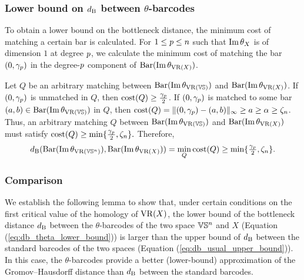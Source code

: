 \subsubsection{Lower bound on $d_{\mathrm{B}}$ between $\theta$-barcodes}
\label{subsub:db_theta_lower_bound}

To obtain a lower bound on the bottleneck distance, the minimum cost of matching a certain bar is calculated. 
For $1 \leq p \leq n$ such that $\operatorname{Im} \theta_X$ is of dimension $1$ at degree $p$, we calculate the minimum cost of matching the bar $(0,\gamma_p )$ in the degree-$p$ component of $\operatorname{Bar}(\operatorname{Im} \theta_{\operatorname{VR}(X)})$.


Let $Q$ be an arbitrary matching between $\operatorname{Bar}(\operatorname{Im} \theta_{\operatorname{VR}(\mathbb{V}\mathbb{S})})$ and $\operatorname{Bar}(\operatorname{Im} \theta_{\operatorname{VR}(X)})$.
If $(0,\gamma_p )$ is unmatched in $Q$, then $\mathrm{cost}(Q) \geq \tfrac{\gamma_p }{2}$. 
If $(0,\gamma_p )$ is matched to some bar $(a,b) \in \operatorname{Bar}(\operatorname{Im} \theta_{\operatorname{VR}(\mathbb{V}\mathbb{S})})$ in $Q$, then 
$\mathrm{cost}(Q) =  \|(0,\gamma_p ) - (a,b)\|_\infty \geq  a \geq \alpha \geq \zeta_n$.
Thus, an arbitrary matching $Q$ between $\operatorname{Bar}(\operatorname{Im} \theta_{\operatorname{VR}(\mathbb{V}\mathbb{S})})$ and $\operatorname{Bar}(\operatorname{Im} \theta_{\operatorname{VR}(X)})$ must satisfy $\mathrm{cost}(Q) 
    \geq \min\{\tfrac{\gamma_p }{2}, \zeta_n\}.$
Therefore, 
\begin{equation}\label{eq:db_theta_lower_bound}
    \db(\thetabarc{\VS^n}, \thetabarc{X})
    = \min_Q \cost(Q) 
    \geq \min\{\tfrac{\gamma_\degp }{2}, \zeta_n\}. %
\end{equation}

\subsubsection{Comparison}
\label{subsub:comparison}

We establish the following lemma to show that, under certain conditions on the first critical value of the homology of  $\operatorname{VR}(X)$, the lower bound of the bottleneck distance $d_{\mathrm{B}}$ between the $\theta$-barcodes of the two space $\mathbb{V}\mathbb{S}^n$ and $X$ (Equation (\ref{eq:db_theta_lower_bound}))  is larger than the upper bound of $d_{\mathrm{B}}$ between the standard barcodes of the two spaces (Equation (\ref{eq:db_usual_upper_bound})). 
In this case, the $\theta$-barcodes provide a better (lower-bound) approximation of the Gromov--Hausdorff distance than $d_{\mathrm{B}}$ between the standard barcodes.

